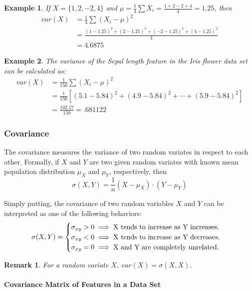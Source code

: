 \documentclass[12pt]{article}
\newtheorem{remark}{Remark}[section]
\newtheorem{example}{Example}[section]
\begin{document}
\begin{example}
	If $X=\{1, 2, -2, 4\}$ and $\mu = \frac{1}{4} \sum X_i = \frac{1+2-2+4}{4} = 1.25$, then
	\begin{align*}
	var(X) &= \frac{1}{4} \sum (X_i - \mu)^2 \\
	&= \frac{(1-1.25)^2 + (2-1.25)^2 + (-2-1.25)^2 + (4-1.25)^2}{4} \\
	&= 4.6875
	\end{align*}
\end{example}

\begin{example}
	The variance of the Sepal length feature in the Iris flower data set can be calculated as:
	\begin{align*}
	var(X) &= \frac{1}{150} \sum (X_i - \mu)^2 \\
	&= \frac{1}{150} [(5.1-5.84)^2 + (4.9-5.84)^2 + \cdots + (5.9-5.84)^2] \\
	&= \frac{102.17}{150} = .681122
	\end{align*}
\end{example}

\subsubsection{Covariance}

The covariance measures the variance of two random variates in respect to each other. Formally, if $X$ and $Y$ are two given random variates with known mean population distribution $\mu_X$ and $\mu_Y$, respectively, then
$$\sigma(X, Y) = \frac{1}{n} (X - \mu_X) \cdot (Y - \mu_Y) $$

Simply putting, the covariance of two random variables $X$ and $Y$ can be interpreted as one of the following behaviors:
$$
\sigma(X,Y) = \begin{cases}
\sigma_{xy} > 0 \implies \textnormal{X tends to increase as Y increases.}\\
\sigma_{xy} < 0 \implies \textnormal{X tends to increase as Y decreases.}\\
\sigma_{xy} = 0 \implies \textnormal{X and Y are completely unrelated.}
\end{cases}
$$

\begin{remark}
	For a random variate $X$, $var(X) = \sigma(X, X)$.
\end{remark}

\paragraph{Covariance Matrix of Features in a Data Set}
\end{document}
